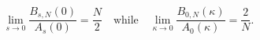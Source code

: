 \begin{equation}
\lim_{s\to 0}\frac{B_{s,N}(0)}{A_s(0)}=\frac{N}{2}
\quad\text{while}\quad
\lim_{\kappa\to 0}\frac{B_{0,N}(\kappa)}{A_0(\kappa)}=\frac{2}{N}.
\label{N22N}
\end{equation}


